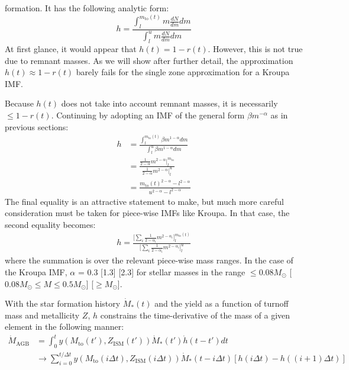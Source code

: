 \documentclass{report}
\newcommand\ddfrac[2]{\frac{\displaystyle #1}{\displaystyle #2}}
\begin{document}
formation. It has the following analytic form: 
\begin{equation}
h = \ddfrac{
	\int_l^{m_\text{to}(t)}m\frac{dN}{dm}dm
}{
	\int_l^u m\frac{dN}{dm}dm
}
\end{equation}
At first glance, it would appear that $h(t) = 1 - r(t)$. However, this is 
not true due to remnant masses. As we will show after further detail, the 
approximation $h(t) \approx 1 - r(t)$ barely fails for the single zone 
approximation for a Kroupa IMF. 
\par
Because $h(t)$ does not take into account remnant masses, it is necessarily 
$\leq 1 - r(t)$. Continuing by adopting an IMF of the general form 
$\beta m^{-\alpha}$ as in previous sections: 
\begin{equation}\begin{split}
h &= \ddfrac{
	\int_l^{m_\text{to}(t)}\beta m^{1 - \alpha}dm
}{
	\int_l^u \beta m^{1 - \alpha}dm
} \\ 
&= \ddfrac{
	\ddfrac{1}{2 - \alpha}m^{2 - \alpha}\Big|_l^{m_\text{to}}
}{
	\ddfrac{1}{2 - \alpha}m^{2 - \alpha}\Big|_l^u
} \\
&= \ddfrac{
	m_\text{to}(t)^{2 - \alpha} - l^{2 - \alpha}
}{
	u^{2 - \alpha} - l^{2 - \alpha}
}
\end{split}\end{equation}
The final equality is an attractive statement to make, but much more careful 
consideration must be taken for piece-wise IMFs like Kroupa. In that case, 
the second equality becomes: 
\begin{equation}\begin{split}
h = \ddfrac{
	\Big[\sum_i \ddfrac{1}{2 - \alpha_i}m^{2 - \alpha_i}\Big]_l^{m_\text{to}(t)}
}{
	\Big[\sum_i \ddfrac{1}{2 - \alpha_i}m^{2 - \alpha_i}\Big]_l^u
}
\end{split}\end{equation}
where the summation is over the relevant piece-wise mass ranges. In the case 
of the Kroupa IMF, $\alpha$ = 0.3 [1.3] [2.3] for stellar masses in the 
range $\leq0.08 M_\odot$ [$0.08 M_\odot\leq M \leq0.5 M_\odot$] 
[$\geq M_\odot$]. 
\par
With the star formation history $\dot{M}_*(t)$ and the yield as a function of 
turnoff mass and metallicity $Z$, $h$ constrains the time-derivative of the 
mass of a given element in the following manner: 
\begin{equation}\begin{split}
\dot{M}_\text{AGB} &= \int_0^t y(M_\text{to}(t'), Z_\text{ISM}(t')) 
\dot{M}_*(t') \dot{h}(t - t')dt \\ 
&\rightarrow \sum_{i = 0}^{t/\Delta t} y(M_\text{to}(i\Delta t), 
Z_\text{ISM}(i\Delta t)) \dot{M}_*(t - i\Delta t)[h(i\Delta t) - 
h((i + 1)\Delta t)] 
\end{split}\end{equation}
\end{document}
